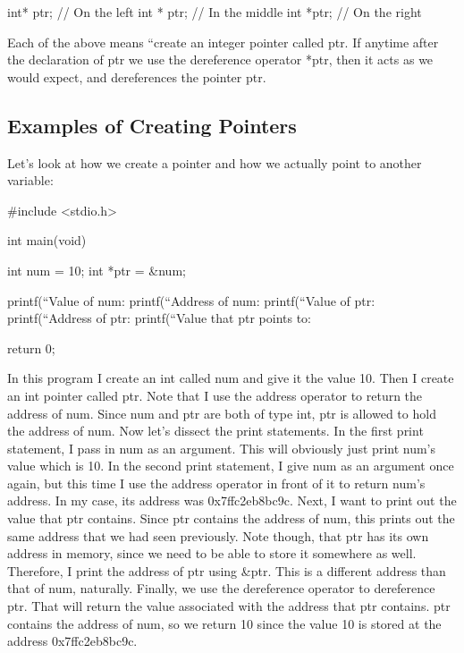 \documentclass{article}
\begin{document}
\begin{cblk}
int* ptr;     // On the left
int * ptr;    // In the middle
int *ptr;     // On the right
\end{cblk}

Each of the above means “create an integer pointer called ptr. If anytime after the declaration of ptr we use
the dereference operator *ptr, then it acts as we would expect, and dereferences the pointer ptr.

\subsection{Examples of Creating Pointers}

Let’s look at how we create a pointer and how we actually point to another variable:

\begin{cblk}
#include <stdio.h>

int main(void) {

	int num = 10;
	int *ptr = &num;

	printf(“Value of num: %
	printf(“Address of num: %
	printf(“Value of ptr: %
	printf(“Address of ptr: %
	printf(“Value that ptr points to: %

	return 0;
}
\end{cblk}

In this program I create an int called num and give it the value 10. Then I create an int pointer called ptr.
Note that I use the address operator to return the address of num. Since num and ptr are both of type int,
ptr is allowed to hold the address of num. Now let’s dissect the print statements. In the first print
statement, I pass in num as an argument. This will obviously just print num’s value which is 10. In the
second print statement, I give num as an argument once again, but this time I use the address operator in
front of it to return num’s address. In my case, its address was 0x7ffc2eb8bc9c. Next, I want to print out
the value that ptr contains. Since ptr contains the address of num, this prints out the same address that we
had seen previously. Note though, that ptr has its own address in memory, since we need to be able to store
it somewhere as well. Therefore, I print the address of ptr using &ptr. This is a different address than that
of num, naturally. Finally, we use the dereference operator to dereference ptr. That will return the value
associated with the address that ptr contains. ptr contains the address of num, so we return 10 since the
value 10 is stored at the address 0x7ffc2eb8bc9c.
\end{document}
